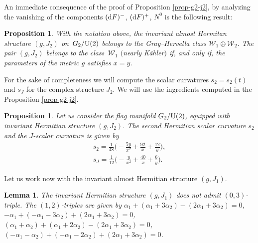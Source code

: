 \documentclass[pdftex]{sigma}%
\numberwithin{equation}{section}
\newtheorem{Lemma}[Theorem]{Lemma}
\newtheorem{Proposition}[Theorem]{Proposition}
 { \theoremstyle{definition}
\newtheorem{Definition}[Theorem]{Definition}
\newtheorem{Question}[Theorem]{Question}
\newtheorem*{Notation}{Notation}
\newtheorem{Example}[Theorem]{Example}
\newtheorem{Remark}[Theorem]{Remark} }
\begin{document}
An immediate consequence of the proof of Proposition \ref{prop-g2-j2}, by analyzing the vanishing of the components $({\rm d}F)^{-}$, $({\rm d}F)^{+}$, $N^0$ is the following result:
\begin{Proposition}
With the notation above, the invariant almost Hermitan structure $(g, J_{2})$ on~$G_{2}/{\rm U}(2)$ belongs to the Gray--Hervella class $\mathcal{W}_{1}\oplus \mathcal{W}_{2}$. The pair $(g, J_{2})$ belongs to the class~$\mathcal{W}_{1}$ $($nearly K\"ahler$)$ if, and only if, the parameters of the metric $g$ satisfies $x=y$.
\end{Proposition}

For the sake of completeness we will compute the scalar curvatures $s_{2}=s_2(t)$ and $s_J$ for the complex structure $J_2$. We will use the ingredients computed in the Proposition \ref{prop-g2-j2}.

\begin{Proposition}
Let us consider the flag manifold $G_2/{\rm U}(2)$, equipped with invariant Hermitian structure $(g, J_{2})$. The second Hermitian scalar curvature $s_2$ and the $J$-scalar curvature is given by
\begin{gather*}
s_{2}=\frac{1}{48} \bigg({-}\frac{5 y}{x^2}+\frac{92}{x}+\frac{12}{y}\bigg),
\\
s_{J}=\frac{1}{12} \bigg({-}\frac{y}{x^2}+\frac{40}{x}+\frac{6}{y}\bigg).
\end{gather*}
\end{Proposition}

Let us work now with the invariant almost Hermitian structure $(g, J_{1})$.

\begin{Lemma}
The invariant Hermitian structure $(g, J_{1})$ does not admit $(0,3)$-triple. The $(1,2)$-triples are given by $\alpha_1+( \alpha_1+3\alpha_2) - ( 2\alpha_1+3\alpha_2)=0$, $-\alpha_1 + ( -\alpha_1-3\alpha_2)+(2\alpha_1+3\alpha_2)=0$, $(\alpha_1+\alpha_2) + ( \alpha_1+2\alpha_2)-(2\alpha_1+3\alpha_2)=0$, $( -\alpha_1-\alpha_2)+ ( -\alpha_1-2\alpha_2)+(2\alpha_1+3\alpha_2)=0$.
\end{Lemma}
\end{document}
